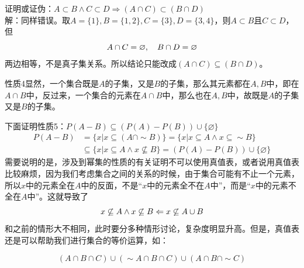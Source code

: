 \documentclass[lang=cn,11pt]{elegantbook}
\begin{document}
证明或证伪：$A\subset B\land C\subset D\Rightarrow (A\cap C)\subset (B\cap D)$\\
解：同样错误。取$A=\{1\},B=\{1,2\},C=\{3\},D=\{3,4\}$，则$A\subset B$且$C\subset D$，但
\vspace{-10pt}\[A\cap C=\varnothing,\quad B\cap D=\varnothing\vspace{-10pt}\]
两边相等，不是真子集关系。所以结论只能改成$(A\cap C)\subseteq (B\cap D)$。

性质4显然，一个集合既是$A$的子集，又是$B$的子集，那么其元素都在$A,B$中，即在$A\cap B$中，反过来，一个集合的元素在$A\cap B$中，那么也在$A,B$中，故既是$A$的子集又是$B$的子集。

下面证明性质5：$ P(A - B) \subseteq (P(A) - P(B))\cup\{\varnothing\}$
\begin{align*}
P(A - B) &= \{x|x\subseteq (A\cap\sim B)\}=\{x|x\subseteq A\land x\subseteq\sim B\}\\
&\subseteq\{x|x\subseteq A\land x\not\subseteq B\}=(P(A)-P(B))\cup\{\varnothing\}
\end{align*}
需要说明的是，涉及到幂集的性质的有关证明不可以使用真值表，或者说用真值表比较麻烦，因为我们考虑集合之间的关系的时候，由于集合可能有不止一个元素，所以$x$中的元素全在$A$中的反面，不是“$x$中的元素全不在$A$中”，而是“$x$中的元素不全在$A$中”。这就导致了\vspace{-10pt}\[x\not\subseteq A\land x\not\subseteq B\Leftarrow x\not\subseteq A\cup B\vspace{-10pt}\]和之前的情形大不相同，此时要分多种情形讨论，复杂度明显升高。但是，真值表还是可以帮助我们进行集合的等价运算，如：
\begin{example}
\[(A\cap B\cap C)\cup(\sim A\cap B\cap C)\cup(A\cap B\cap\sim C)\]\end{example}
\end{document}
